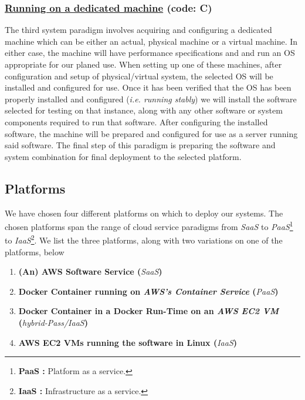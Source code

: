 \subsubsection{\underline{Running on a dedicated machine} (code: \textbf{C}) }
The third system paradigm involves acquiring and configuring a dedicated machine which can be either an actual, physical machine or a virtual machine.  In either case, the machine will have performance specifications and and run an OS appropriate for our planed use.  When setting up one of these machines, after configuration and setup of physical/virtual system, the selected OS will be installed and configured for use.  Once it has been verified that the OS has been properly installed and configured (\emph{i.e. running stably}) we will install the software selected for testing on that instance, along with any other software or system components required to run that software.  After configuring the installed software, the machine will be prepared and configured for use as a server running said software.  The final step of this paradigm is preparing the software and system combination for final deployment to the selected platform.





\subsection{Platforms}

We have chosen four different platforms on which to deploy our systems.  The chosen platforms span the range of cloud service paradigms from \emph{SaaS} to \emph{PaaS}\footnote{\textbf{PaaS :} Platform as a service.} to \emph{IaaS}\footnote{\textbf{IaaS :} Infrastructure as a service.}.  We list the three platforms, along with two variations on one of the platforms, below

\begin{spacing}{1.30}
\begin{enumerate}[label=\large{\textbf{\arabic*}):}]
		\item \textbf{(An) AWS Software Service (}\emph{SaaS}\textbf{)}
		\item \textbf{Docker Container running on \emph{AWS's Container Service} (}\emph{PaaS}\textbf{)}
		\item \textbf{Docker Container in a Docker Run-Time on an \emph{AWS EC2 VM} (}\emph{hybrid-Pass/IaaS}\textbf{)}
		\item \textbf{AWS EC2 VMs running the software in Linux (}\emph{IaaS}\textbf{)}
	\end{enumerate}
\end{spacing}


